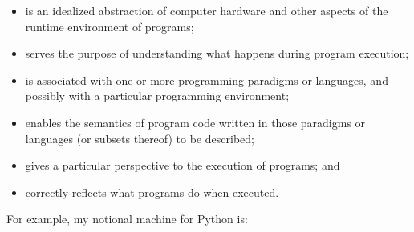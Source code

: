 \begin{itemize}

\item
  is an idealized abstraction of computer hardware and other aspects
  of the runtime environment of programs;

\item
  serves the purpose of understanding what happens during program
  execution;

\item
  is associated with one or more programming paradigms or languages,
  and possibly with a particular programming environment;

\item
  enables the semantics of program code written in those paradigms or
  languages (or subsets thereof) to be described;

\item
  gives a particular perspective to the execution of programs; and

\item
  correctly reflects what programs do when executed.

\end{itemize}

\noindent
For example, my notional machine for Python is:

